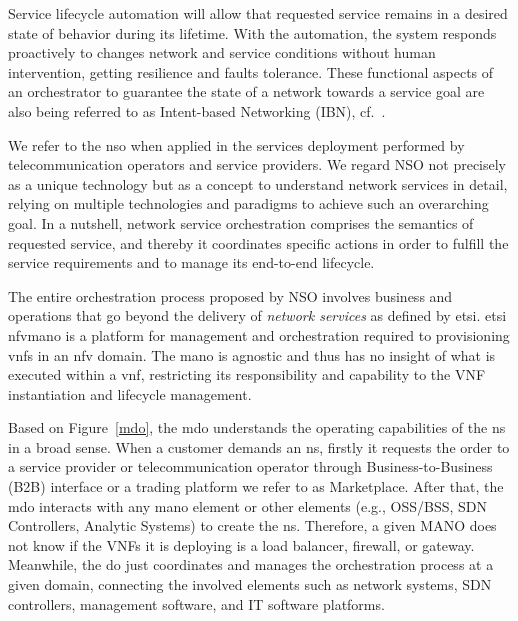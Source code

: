 Service lifecycle automation will allow that requested service remains in a desired state of behavior during its lifetime. With the automation, the system responds proactively to changes network and service conditions without human intervention, getting resilience and faults tolerance. These functional aspects of an orchestrator to guarantee the state of a network towards a service goal are also being referred to as Intent-based Networking (IBN), cf.~\cite{ibn}.

We refer to the \acrfull{nso} when applied in the services deployment performed by telecommunication operators and service providers. We regard NSO not precisely as a unique technology but as a concept to  understand network services in detail, relying on multiple technologies and paradigms to achieve such an overarching goal. In a nutshell, network service orchestration comprises the semantics of requested service, and thereby it coordinates specific actions in order to fulfill the service requirements and to manage its end-to-end lifecycle. 




The entire orchestration process proposed by NSO involves business and operations that go beyond the delivery of \textit{network services} as defined by \gls{etsi}. \gls{etsi} \gls{nfvmano} is a platform for management and orchestration required to provisioning \glspl{vnf} in an \gls{nfv} domain. The \gls{mano} is agnostic and thus has no insight of what is executed within a \gls{vnf}, restricting its responsibility and capability to the VNF instantiation and lifecycle management.

Based on Figure~\ref{mdo}, the \gls{mdo} understands the operating capabilities of the \gls{ns} in a broad sense. When a customer demands an \gls{ns}, firstly it requests the order to a service provider or telecommunication operator through Business-to-Business (B2B) interface or a trading platform we refer to as Marketplace. After that, the \gls{mdo} interacts with any \gls{mano} element or other elements (e.g., OSS/BSS, SDN Controllers, Analytic Systems)  to create the \gls{ns}. Therefore, a given MANO does not know if the VNFs it is deploying is a load balancer, firewall, or gateway. Meanwhile, the \gls{do} just coordinates and manages the orchestration process at a given domain, connecting the involved elements such as network systems, SDN controllers, management software, and IT software platforms.

